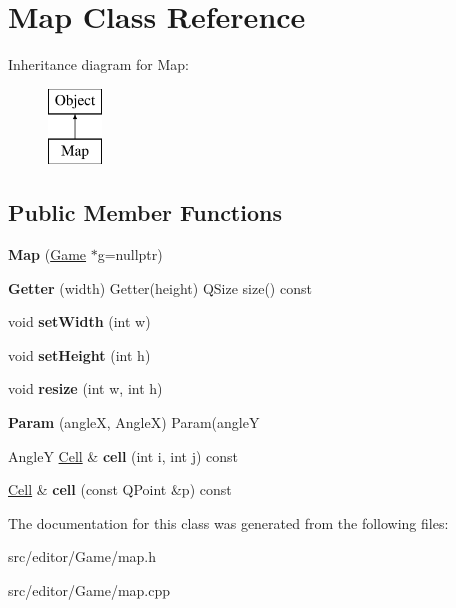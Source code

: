 \hypertarget{class_map}{\section{\-Map \-Class \-Reference}
\label{class_map}
}
\-Inheritance diagram for \-Map\-:\begin{figure}[H]
\begin{center}
\leavevmode
\includegraphics[height=2.000000cm]{class_map}
\end{center}
\end{figure}
\subsection*{\-Public \-Member \-Functions}
\begin{DoxyCompactItemize}
\item 
\hypertarget{class_map_a3153fcba3c619fac862f301385be66a4}{{\bfseries \-Map} (\hyperlink{class_game}{\-Game} $\ast$g=nullptr)}\label{class_map_a3153fcba3c619fac862f301385be66a4}

\item 
\hypertarget{class_map_a345bff808e25aa259775751f685b4e4d}{{\bfseries \-Getter} (width) \-Getter(height) \-Q\-Size size() const }\label{class_map_a345bff808e25aa259775751f685b4e4d}

\item 
\hypertarget{class_map_a2915ccde4d8a2ba8142677baea803467}{void {\bfseries set\-Width} (int w)}\label{class_map_a2915ccde4d8a2ba8142677baea803467}

\item 
\hypertarget{class_map_affab3537641a7985559f83ea083e00ca}{void {\bfseries set\-Height} (int h)}\label{class_map_affab3537641a7985559f83ea083e00ca}

\item 
\hypertarget{class_map_a5f7c31af6620d00ce8a812c8710345ab}{void {\bfseries resize} (int w, int h)}\label{class_map_a5f7c31af6620d00ce8a812c8710345ab}

\item 
\hypertarget{class_map_a7dcf1a44f62d1aac156e500299e0fe45}{{\bfseries \-Param} (angle\-X, \-Angle\-X) \-Param(angle\-Y}\label{class_map_a7dcf1a44f62d1aac156e500299e0fe45}

\item 
\hypertarget{class_map_a6c94b3e99490efa0f170db132dc9f5b8}{\-Angle\-Y \hyperlink{class_cell}{\-Cell} \& {\bfseries cell} (int i, int j) const }\label{class_map_a6c94b3e99490efa0f170db132dc9f5b8}

\item 
\hypertarget{class_map_ae0b03b422a10edbfa7bd0b4bdd085793}{\hyperlink{class_cell}{\-Cell} \& {\bfseries cell} (const \-Q\-Point \&p) const }\label{class_map_ae0b03b422a10edbfa7bd0b4bdd085793}

\end{DoxyCompactItemize}


\-The documentation for this class was generated from the following files\-:\begin{DoxyCompactItemize}
\item 
src/editor/\-Game/map.\-h\item 
src/editor/\-Game/map.\-cpp\end{DoxyCompactItemize}
